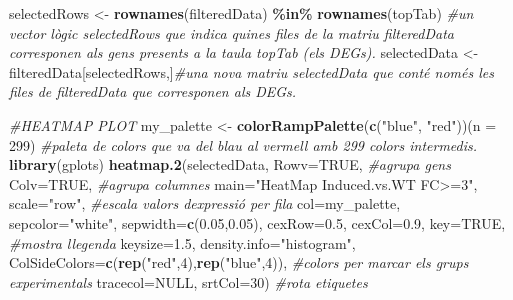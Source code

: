 \documentclass[
]{article}
\newenvironment{Shaded}{\begin{snugshade}}{\end{snugshade}}
\newcommand{\AttributeTok}[1]{\textcolor[rgb]{0.13,0.29,0.53}{#1}}
\newcommand{\CommentTok}[1]{\textcolor[rgb]{0.56,0.35,0.01}{\textit{#1}}}
\newcommand{\ConstantTok}[1]{\textcolor[rgb]{0.56,0.35,0.01}{#1}}
\newcommand{\DecValTok}[1]{\textcolor[rgb]{0.00,0.00,0.81}{#1}}
\newcommand{\FloatTok}[1]{\textcolor[rgb]{0.00,0.00,0.81}{#1}}
\newcommand{\FunctionTok}[1]{\textcolor[rgb]{0.13,0.29,0.53}{\textbf{#1}}}
\newcommand{\NormalTok}[1]{#1}
\newcommand{\OtherTok}[1]{\textcolor[rgb]{0.56,0.35,0.01}{#1}}
\newcommand{\SpecialCharTok}[1]{\textcolor[rgb]{0.81,0.36,0.00}{\textbf{#1}}}
\newcommand{\StringTok}[1]{\textcolor[rgb]{0.31,0.60,0.02}{#1}}
\begin{document}
\begin{Shaded}
\begin{Highlighting}[]
\NormalTok{selectedRows }\OtherTok{\textless{}{-}} \FunctionTok{rownames}\NormalTok{(filteredData) }\SpecialCharTok{\%in\%} \FunctionTok{rownames}\NormalTok{(topTab) }\CommentTok{\#un vector lògic selectedRows que indica quines files de la matriu filteredData corresponen als gens presents a la taula topTab (els DEGs).}
\NormalTok{selectedData }\OtherTok{\textless{}{-}}\NormalTok{ filteredData[selectedRows,]}\CommentTok{\#una nova matriu selectedData que conté només les files de filteredData que corresponen als DEGs.}

\CommentTok{\#HEATMAP PLOT}
\NormalTok{my\_palette }\OtherTok{\textless{}{-}} \FunctionTok{colorRampPalette}\NormalTok{(}\FunctionTok{c}\NormalTok{(}\StringTok{"blue"}\NormalTok{, }\StringTok{"red"}\NormalTok{))(}\AttributeTok{n =} \DecValTok{299}\NormalTok{) }\CommentTok{\#paleta de colors que va del blau al vermell amb 299 colors intermedis. }
\FunctionTok{library}\NormalTok{(gplots)}
\FunctionTok{heatmap.2}\NormalTok{(selectedData,}
          \AttributeTok{Rowv=}\ConstantTok{TRUE}\NormalTok{, }\CommentTok{\#agrupa gens}
          \AttributeTok{Colv=}\ConstantTok{TRUE}\NormalTok{, }\CommentTok{\#agrupa columnes}
          \AttributeTok{main=}\StringTok{"HeatMap Induced.vs.WT FC\textgreater{}=3"}\NormalTok{,}
          \AttributeTok{scale=}\StringTok{"row"}\NormalTok{, }\CommentTok{\#escala valors d\textquotesingle{}expressió per fila}
          \AttributeTok{col=}\NormalTok{my\_palette,}
          \AttributeTok{sepcolor=}\StringTok{"white"}\NormalTok{,}
          \AttributeTok{sepwidth=}\FunctionTok{c}\NormalTok{(}\FloatTok{0.05}\NormalTok{,}\FloatTok{0.05}\NormalTok{),}
          \AttributeTok{cexRow=}\FloatTok{0.5}\NormalTok{,}
          \AttributeTok{cexCol=}\FloatTok{0.9}\NormalTok{,}
          \AttributeTok{key=}\ConstantTok{TRUE}\NormalTok{, }\CommentTok{\#mostra llegenda}
          \AttributeTok{keysize=}\FloatTok{1.5}\NormalTok{,}
          \AttributeTok{density.info=}\StringTok{"histogram"}\NormalTok{,}
          \AttributeTok{ColSideColors=}\FunctionTok{c}\NormalTok{(}\FunctionTok{rep}\NormalTok{(}\StringTok{"red"}\NormalTok{,}\DecValTok{4}\NormalTok{),}\FunctionTok{rep}\NormalTok{(}\StringTok{"blue"}\NormalTok{,}\DecValTok{4}\NormalTok{)), }\CommentTok{\#colors per marcar els grups experimentals}
          \AttributeTok{tracecol=}\ConstantTok{NULL}\NormalTok{,}
          \AttributeTok{srtCol=}\DecValTok{30}\NormalTok{) }\CommentTok{\#rota etiquetes}
\end{Highlighting}
\end{Shaded}
\end{document}
